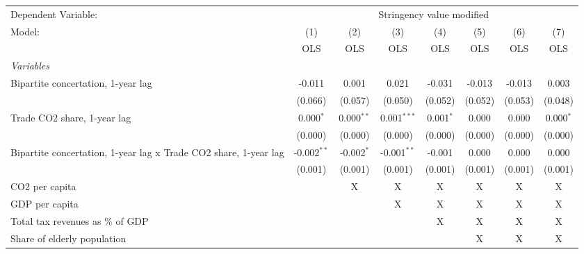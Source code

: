 
\begingroup
\centering
\begin{tabular}{lccccccc}
   \toprule
   Dependent Variable: & \multicolumn{7}{c}{Stringency value modified}\\
   Model:                                                           & (1)           & (2)          & (3)           & (4)         & (5)     & (6)     & (7)\\  
                                                                    &  OLS          & OLS          & OLS           & OLS         & OLS     & OLS     & OLS\\  
   \midrule
   \emph{Variables}\\
   Bipartite concertation, 1-year lag                               & -0.011        & 0.001        & 0.021         & -0.031      & -0.013  & -0.013  & 0.003\\   
                                                                    & (0.066)       & (0.057)      & (0.050)       & (0.052)     & (0.052) & (0.053) & (0.048)\\   
   Trade CO2 share, 1-year lag                                      & 0.000$^{*}$   & 0.000$^{**}$ & 0.001$^{***}$ & 0.001$^{*}$ & 0.000   & 0.000   & 0.000$^{*}$\\   
                                                                    & (0.000)       & (0.000)      & (0.000)       & (0.000)     & (0.000) & (0.000) & (0.000)\\   
   Bipartite concertation, 1-year lag x Trade CO2 share, 1-year lag & -0.002$^{**}$ & -0.002$^{*}$ & -0.001$^{**}$ & -0.001      & 0.000   & 0.000   & 0.000\\   
                                                                    & (0.001)       & (0.001)      & (0.001)       & (0.001)     & (0.001) & (0.001) & (0.001)\\   
   CO2 per capita                                                   &               & X            & X             & X           & X       & X       & X\\  
   GDP per capita                                                   &               &              & X             & X           & X       & X       & X\\  
   Total tax revenues as \% of GDP                                  &               &              &               & X           & X       & X       & X\\  
   Share of elderly population                                      &               &              &               &             & X       & X       & X\\  

\end{tabular}
